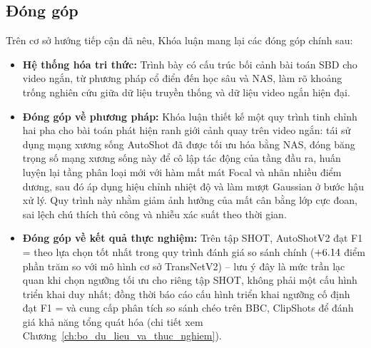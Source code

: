\subsection{Đóng góp}
Trên cơ sở hướng tiếp cận đã nêu, Khóa luận mang lại các đóng góp chính sau:
\begin{itemize}
    \item \textbf{Hệ thống hóa tri thức:} Trình bày có cấu trúc bối cảnh bài toán SBD cho video ngắn, từ phương pháp cổ điển đến học sâu và NAS, làm rõ khoảng trống nghiên cứu giữa dữ liệu truyền thống và dữ liệu video ngắn hiện đại.
    \item \textbf{Đóng góp về phương pháp:} Khóa luận thiết kế một quy trình tinh chỉnh hai pha cho bài toán phát hiện ranh giới cảnh quay trên video ngắn: tái sử dụng mạng xương sống AutoShot đã được tối ưu hóa bằng NAS, đóng băng trọng số mạng xương sống này để cô lập tác động của tầng đầu ra, huấn luyện lại tầng phân loại mới với hàm mất mát Focal và nhãn nhiều điểm dương, sau đó áp dụng hiệu chỉnh nhiệt độ và làm mượt Gaussian ở bước hậu xử lý. Quy trình này nhằm giảm ảnh hưởng của mất cân bằng lớp cực đoan, sai lệch chú thích thủ công và nhiễu xác suất theo thời gian.
    \item \textbf{Đóng góp về kết quả thực nghiệm:} Trên tập SHOT, AutoShotV2 đạt F1 = \ASVTwoBestShotFOne{} theo lựa chọn tốt nhất trong quy trình đánh giá so sánh chính ($+6.14{}$ điểm phần trăm so với mô hình cơ sở TransNetV2) -- lưu ý đây là mức trần lạc quan khi chọn ngưỡng tối ưu cho riêng tập SHOT, không phải một cấu hình triển khai duy nhất; đồng thời báo cáo cấu hình triển khai ngưỡng cố định đạt F1 = \ASVTwoShotFOne{} và cung cấp phân tích so sánh chéo trên BBC, ClipShots để đánh giá khả năng tổng quát hóa (chi tiết xem Chương~\ref{ch:bo_du_lieu_va_thuc_nghiem}).
\end{itemize}

